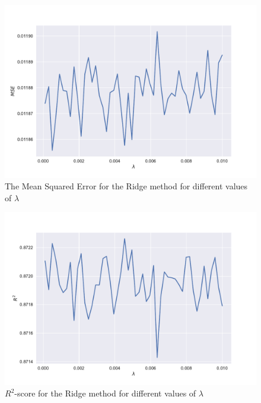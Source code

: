 \documentclass[a4paper,10pt,english]{article}
\begin{document}
\begin{figure}[h!]
	\centering 
	\includegraphics[scale=0.6]{../results/part_d_reg_MSE.pdf}
	\caption{The Mean Squared Error for the Ridge method for different values of $\lambda$}
	\label{part_d_MSE}
\end{figure}

\begin{figure}[h!]
	\centering 
	\includegraphics[scale=0.6]{../results/part_d_reg_R2.pdf}
	\caption{$R^2$-score for the Ridge method for different values of $\lambda$}
	\label{part_d_R2}
\end{figure}
\end{document}
